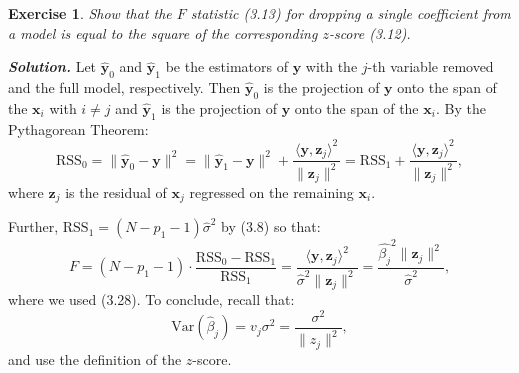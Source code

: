 \documentclass[12pt]{article}
\def\var{\text{Var}}
\def\bx{\textbf{x}}
\def\bz{\textbf{z}}
\def\RSS{\text{RSS}}
\def\by{\textbf{y}}
\newtheorem{exercise}{Exercise}[section]
\newenvironment{solution}[1][\it{Solution}]{\textbf{#1. } }{\vspace{.5cm}}
\begin{document}
\begin{exercise}
		Show that the $F$ statistic (3.13) for dropping a single coefficient
		from a model is equal to the square of the corresponding $z$-score (3.12).
\end{exercise}
\begin{solution}
	Let $\hat{\by}_0$ and $\hat{\by}_1$ be the estimators of $\by$ with the $j$-th variable removed and the full model, respectively. Then  $\hat{\by}_0$ is the projection of $\by$ onto the span of the $\bx_i$ with $i \neq j$ and $\hat{\by}_1$ is the projection of $\by$ onto the span of the $\bx_i$. By the Pythagorean Theorem:
	$$\RSS_0 = \|\hat{\by}_0 - \by\|^2 = \|\hat{\by}_1 - \by\|^2 + \frac{\langle \by, \bz_j\rangle^2}{\|\bz_j\|^2} = \RSS_1+ \frac{\langle \by, \bz_j\rangle^2}{\|\bz_j\|^2}, $$
	where $\bz_j$ is the residual of $\bx_j$ regressed on the remaining $\bx_i$. 
	
	Further, $\RSS_1 = (N-p_1 -1) \hat{\sigma}^2$ by (3.8) so that:
	$$F = (N - p_1 -1 )\cdot  \frac{\RSS_0-\RSS_1}{\RSS_1} = \frac{\langle \by, \bz_j\rangle^2}{\hat{\sigma}^2\|\bz_j\|^2} = \frac{\hat{\beta_j}^2 \|\bz_j\|^2}{\hat{\sigma}^2},$$
	where we used (3.28). To conclude, recall that:
 $$\var(\hat{\beta}_j) = v_j \sigma^2 = \frac{\sigma^2}{\|z_j\|^2},$$
 and use the definition of the $z$-score.
\end{solution} 
\end{document}
